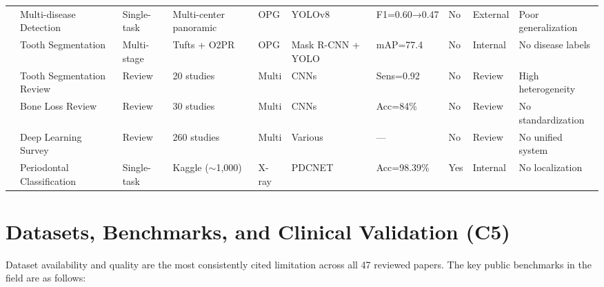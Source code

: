 \documentclass[conference]{IEEEtran}
\begin{document}
\begin{table}[t]
\begin{tabular}{p{0.5cm} p{2.0cm} p{1.3cm} p{2.2cm} p{1.1cm} p{2.4cm} p{1.6cm} p{0.6cm} p{1.3cm} p{2.2cm}}
\cite{muresanu2024automating}    & Multi-disease Detection      & Single-task & Multi-center panoramic          & OPG      & YOLOv8                  & F1=0.60→0.47     & No      & External & Poor generalization \\
\cite{zhang2025reliable}         & Tooth Segmentation           & Multi-stage & Tufts + O2PR                    & OPG      & Mask R-CNN + YOLO       & mAP=77.4         & No      & Internal & No disease labels \\
\cite{bonfanti2025deep}          & Tooth Segmentation Review    & Review      & 20 studies                      & Multi    & CNNs                    & Sens=0.92        & No      & Review   & High heterogeneity \\
\cite{khubrani2025detection}     & Bone Loss Review             & Review      & 30 studies                      & Multi    & CNNs                    & Acc=84\%         & No      & Review   & No standardization \\
\cite{zhou2025deep}              & Deep Learning Survey         & Review      & 260 studies                     & Multi    & Various                 & ---              & No      & Review   & No unified system \\
\cite{bilal2024pdcnet}           & Periodontal Classification   & Single-task & Kaggle ($\sim$1,000)            & X-ray    & PDCNET                  & Acc=98.39\%      & Yes     & Internal & No localization \\
\end{tabular}
\end{table}
\section{Datasets, Benchmarks, and Clinical Validation (C5)}
\label{sec:datasets}

Dataset availability and quality are the most consistently cited limitation across all 47 reviewed papers. The key public benchmarks in the field are as follows:
\end{document}

